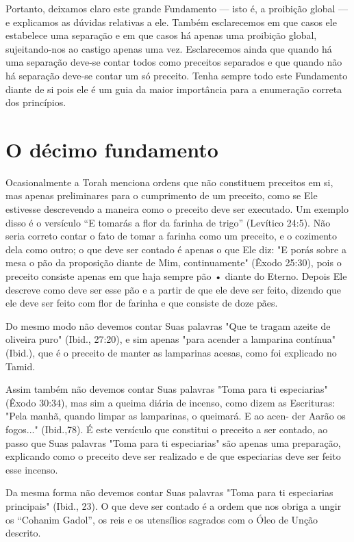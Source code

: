 Portanto, deixamos claro este grande Fundamento --- isto é, a proi­bição
global --- e explicamos as dúvidas relativas a ele. Também esclarecemos
em que casos ele estabelece uma separação e em que casos há apenas uma
proi­bição global, sujeitando-nos ao castigo apenas uma vez.
Esclarecemos ainda que quando há uma separação deve-se contar todos como
preceitos separados e que quando não há separação deve-se contar um só
preceito. Tenha sempre todo este Fundamento diante de si pois ele é um
guia da maior importância para a enumeração correta dos princípios.

\chapter*{O décimo fundamento}

Ocasionalmente a Torah menciona ordens que não constituem pre­ceitos em
si, mas apenas preliminares para o cumprimento de um preceito, co­mo se
Ele estivesse descrevendo a maneira como o preceito deve ser executa­do.
Um exemplo disso é o versículo ``E tomarás a flor da farinha de trigo''
(Le­vítico 24:5). Não seria correto contar o fato de tomar a farinha
como um pre­ceito, e o cozimento dela como outro; o que deve ser contado
é apenas o que Ele diz: "E porás sobre a mesa o pão da proposição diante
de Mim, continua­mente" (Êxodo 25:30), pois o preceito consiste apenas
em que haja sempre pão • diante do Eterno. Depois Ele descreve como deve
ser esse pão e a partir de que ele deve ser feito, dizendo que ele deve
ser feito com flor de farinha e que consiste de doze pães.

Do mesmo modo não devemos contar Suas palavras "Que te tragam azeite de
oliveira puro" (Ibid., 27:20), e sim apenas "para acender a lamparina
contínua" (Ibid.), que é o preceito de manter as lamparinas acesas, como
foi explicado no Tamid.

Assim também não devemos contar Suas palavras "Toma para ti
es­peciarias" (Êxodo 30:34), mas sim a queima diária de incenso, como
dizem as Escrituras: "Pela manhã, quando limpar as lamparinas, o
queimará. E ao acen-
der Aarão os fogos..." (Ibid.,78). É este versículo que constitui o
preceito a ser contado, ao passo que Suas palavras "Toma para ti
especiarias" são apenas uma preparação, explicando como o preceito deve
ser realizado e de que especia­rias deve ser feito esse incenso.

Da mesma forma não devemos contar Suas palavras "Toma para ti
especiarias principais" (Ibid., 23). O que deve ser contado é a ordem
que nos obriga a ungir os ``Cohanim Gadol'', os reis e os utensílios
sagrados com o Óleo de Unção descrito.

